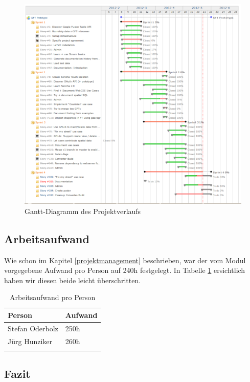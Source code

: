 \begin{figure}[H]
	\centering
	\includegraphics[width=\textwidth]{images/projektmanagement/overall_stories_gantt_chart}
	\caption{Gantt-Diagramm des Projektverlaufs}
	\label{overall_stories_gantt_chart}
\end{figure}

\subsection{Arbeitsaufwand}
Wie schon im Kapitel \ref{projektmanagement} beschrieben, war der vom Modul vorgegebene Aufwand pro Person auf 240h festgelegt. In Tabelle \ref{projektmanagement-arbeitsaufwand} ersichtlich haben wir diesen beide leicht überschritten.

\begin{longtable}{|l|l|}
\hline 
\textbf{Person} & \textbf{Aufwand} \\ 
\hline 
Stefan Oderbolz & 250h \\ 
\hline 
Jürg Hunziker & 260h \\ 
\hline 
\caption{Arbeitsaufwand pro Person}
\label{projektmanagement-arbeitsaufwand}
\end{longtable} 

\subsection{Fazit}
